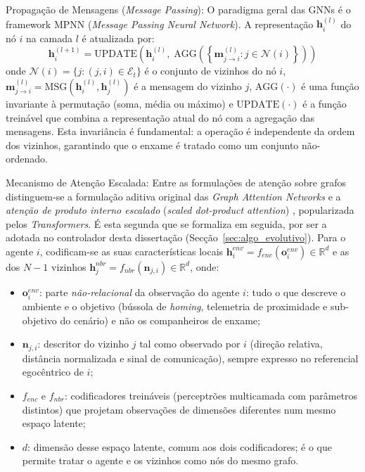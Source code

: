 \documentclass[12pt,reqno, twoside]{amsbook}
\makeatletter
\def\paragraph{\@startsection{paragraph}{4}%
  \z@\z@{-\fontdimen2\font}%
  {\normalfont\bfseries}}
\theoremstyle{plain}
\numberwithin{equation}{chapter}
\numberwithin{section}{chapter}
\numberwithin{table}{chapter}
\numberwithin{figure}{chapter}
\makeatother
\begin{document}
\paragraph{Propagação de Mensagens (\textit{Message Passing}):}
O paradigma geral das GNNs é o framework MPNN (\textit{Message Passing Neural Network}). A representação $\mathbf{h}_i^{(l)}$ do nó $i$ na camada $l$ é atualizada por:
\begin{equation}
    \mathbf{h}_i^{(l+1)} = \text{UPDATE}\!\left(\mathbf{h}_i^{(l)},\;\text{AGG}\!\left(\!\left\{\mathbf{m}_{j \to i}^{(l)} : j \in \mathcal{N}(i)\right\}\!\right)\right)
    \label{eq:mpnn}
\end{equation}
onde $\mathcal{N}(i) = \{j : (j,i) \in \mathcal{E}_t\}$ é o conjunto de vizinhos do nó $i$, $\mathbf{m}_{j \to i}^{(l)} = \text{MSG}(\mathbf{h}_i^{(l)}, \mathbf{h}_j^{(l)})$ é a mensagem do vizinho $j$, $\text{AGG}(\cdot)$ é uma função invariante à permutação (soma, média ou máximo) e $\text{UPDATE}(\cdot)$ é a função treinável que combina a representação atual do nó com a agregação das mensagens. Esta invariância é fundamental: a operação é independente da ordem dos vizinhos, garantindo que o enxame é tratado como um conjunto não-ordenado.

\paragraph{Mecanismo de Atenção Escalada:}
Entre as formulações de atenção sobre grafos distinguem-se a formulação aditiva original das \textit{Graph Attention Networks} \cite{velickovic2018gat} e a \emph{atenção de produto interno escalado} (\textit{scaled dot-product attention}) \cite{vaswani2017attention}, popularizada pelos \textit{Transformers}. É esta segunda que se formaliza em seguida, por ser a adotada no controlador desta dissertação (Secção~\ref{sec:algo_evolutivo}). Para o agente $i$, codificam-se as suas características locais $\mathbf{h}_i^{env} = f_{enc}(\mathbf{o}_i^{env}) \in \mathbb{R}^d$ e as dos $N-1$ vizinhos $\mathbf{h}_j^{nbr} = f_{nbr}(\mathbf{n}_{j,i}) \in \mathbb{R}^d$, onde:
\begin{itemize}
    \item $\mathbf{o}_i^{env}$: parte \emph{não-relacional} da observação do agente $i$: tudo o que descreve o ambiente e o objetivo (bússola de \textit{homing}, telemetria de proximidade e sub-objetivo do cenário) e não os companheiros de enxame;
    \item $\mathbf{n}_{j,i}$: descritor do vizinho $j$ tal como observado por $i$ (direção relativa, distância normalizada e sinal de comunicação), sempre expresso no referencial egocêntrico de $i$;
    \item $f_{enc}$ e $f_{nbr}$: codificadores treináveis (perceptrões multicamada com parâmetros distintos) que projetam observações de dimensões diferentes num mesmo espaço latente;
    \item $d$: dimensão desse espaço latente, comum aos dois codificadores; é o que permite tratar o agente e os vizinhos como nós do mesmo grafo.
\end{itemize}
\end{document}
